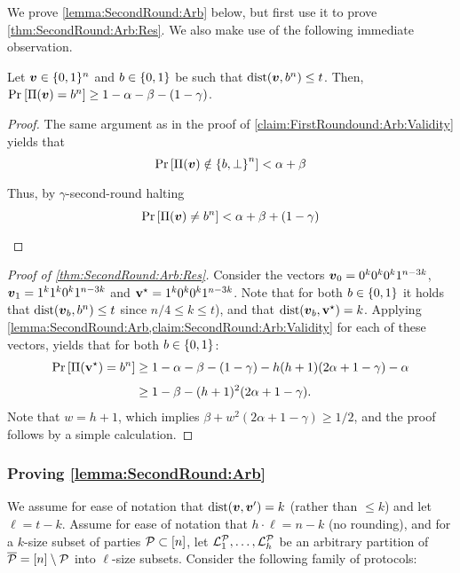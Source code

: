 We prove \cref{lemma:SecondRound:Arb} below, but first use it to prove \cref{thm:SecondRound:Arb:Res}. We also make use of the following immediate observation.
\begin{claim}\label{claim:SecondRound:Arb:Validity}
Let ${ \boldsymbol{v}} \in {\{0,1\}^n}$ and $b \in \{0,1\}$ be such that $\mathrm{dist}({ \boldsymbol{v}},b^n) \le t$. Then, $\Pr_{}\left[\Pi({ \boldsymbol{v}}) = b^n \right] \ge 1 - \alpha - \beta - (1- \gamma)$.
\end{claim}
\begin{proof}
The same argument as in the proof of \cref{claim:FirstRoundound:Arb:Validity} yields that
\begin{align*}
\Pr_{}\left[\Pi({ \boldsymbol{v}}) \notin \left\{b,\bot\right\}^n\right] < \alpha + \beta
\end{align*}
Thus, by $\gamma$-second-round halting
\begin{align*}
\Pr_{}\left[\Pi({ \boldsymbol{v}}) \ne b^n\right] < \alpha + \beta + (1-\gamma)
\end{align*}
\end{proof}

\begin{proof}[Proof of \cref{thm:SecondRound:Arb:Res}]
Consider the vectors ${ \boldsymbol{v}}_0= 0^k 0^k 0^k 1^{n-3k}$, ${ \boldsymbol{v}}_1= 1^k 1^k 0^k 1^{n-3k}$ and $\mathbf{v}^{\star} =1^k 0^k 0^k 1^{n-3k}$. Note that for both $b\in \{0,1\}$ it holds that $\mathrm{dist}({ \boldsymbol{v}}_b,b^n)\le t$ since $n/4 \leq k\leq t$), and that $\mathrm{dist}({ \boldsymbol{v}}_b,\mathbf{v}^{\star})=k$. Applying \cref{lemma:SecondRound:Arb,claim:SecondRound:Arb:Validity} for each of these vectors, yields that for both $b\in \{0,1\}$:
\begin{align*}
\Pr_{}\left[\Pi(\mathbf{v}^{\star}) = b^n\right] &\ge 1- \alpha - \beta -(1- \gamma) - h(h+1)(2\alpha + 1-\gamma) -\alpha\\
&\ge 1- \beta - (h+1)^2(2\alpha + 1-\gamma).
\end{align*}
Note that $w=h+1$, which implies $\beta +w^2(2\alpha + 1-\gamma) \ge 1/2$, and the proof follows by a simple calculation.
\end{proof}

\subsubsection{Proving \cref{lemma:SecondRound:Arb}}
We assume for ease of notation that $\mathrm{dist}({ \boldsymbol{v}},{ \boldsymbol{v}}')=k$ (rather than $\le k$) and let $\ell=t-k$. Assume for ease of notation that $h\cdot \ell = n-k $ (\ie no rounding), and for a $k$-size
subset of parties $\mathcal{P} \subset [n]$, let $ {\cal{L}}^{\mathcal{P}}_1,\dots,{\cal{L}}_h^{\mathcal{P}}$ be an arbitrary partition of ${\overline{\mathcal{P}}} = [n] \setminus \mathcal{P}$ into $\ell$-size subsets. Consider the following family of protocols:


